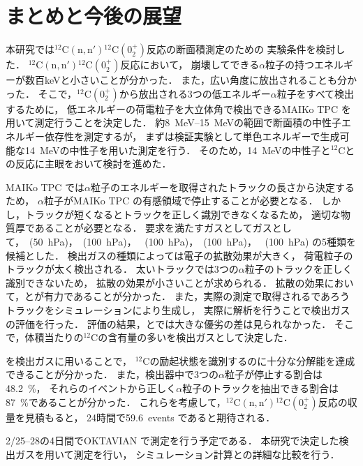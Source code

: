 \documentclass[../master]{subfiles}
\begin{document}
\chapter{まとめと今後の展望}
本研究では${}^{12}\mathrm{C}(\mathrm{n}, \mathrm{n}'){}^{12}\mathrm{C} (0_2^+)$反応の断面積測定のための
実験条件を検討した．
${}^{12}\mathrm{C}(\mathrm{n}, \mathrm{n}'){}^{12}\mathrm{C} (0_2^+)$反応において，
崩壊してできる$\alpha$粒子の持つエネルギーが数百\si{\kilo\electronvolt}と小さいことが分かった．
また，広い角度に放出されることも分かった．
そこで，${}^{12}\mathrm{C} (0_2^+)$から放出される3つの低エネルギー$\alpha$粒子をすべて検出するために，
低エネルギーの荷電粒子を大立体角で検出できるMAIKo TPC を用いて測定行うことを決定した．
約\SIrange{8}{15}{\mega\electronvolt}の範囲で断面積の中性子エネルギー依存性を測定するが，
まずは検証実験として単色エネルギーで生成可能な\SI{14}{\mega\electronvolt}の中性子を用いた測定を行う．
そのため，\SI{14}{\mega\electronvolt}の中性子と${}^{12}\mathrm{C}$との反応に主眼をおいて検討を進めた．

MAIKo TPC では$\alpha$粒子のエネルギーを取得されたトラックの長さから決定するため，
$\alpha$粒子がMAIKo TPC の有感領域で停止することが必要となる．
しかし，トラックが短くなるとトラックを正しく識別できなくなるため，
適切な物質厚であることが必要となる．
要求を満たすガスとしてガスとして，\Methane~(\SI{50}{\hecto\pascal})，\MethaneHydro~(\SI{100}{\hecto\pascal})，
\MethaneHerium~(\SI{100}{\hecto\pascal})，\isoButaneHydro~(\SI{100}{\hecto\pascal})，
\isoButaneHerium~(\SI{100}{\hecto\pascal}) の5種類を候補とした．
検出ガスの種類によっては電子の拡散効果が大きく，
荷電粒子のトラックが太く検出される．
太いトラックでは3つの$\alpha$粒子のトラックを正しく識別できないため，
拡散の効果が小さいことが求められる．
拡散の効果において，\MethaneHydro と\isoButaneHydro が有力であることが分かった．
また，実際の測定で取得されるであろうトラックをシミュレーションにより生成し，
実際に解析を行うことで検出ガスの評価を行った．
評価の結果，\MethaneHydro と\isoButaneHydro では大きな優劣の差は見られなかった．
そこで，体積当たりの${}^{12}\mathrm{C}$の含有量の多い\isoButaneHydro を検出ガスとして決定した．

\isoButaneHydro を検出ガスに用いることで，
${}^{12}\mathrm{C}$の励起状態を識別するのに十分な分解能を達成できることが分かった．
また，検出器中で3つの$\alpha$粒子が停止する割合は\SI{48.2}{\percent}，
それらのイベントから正しく$\alpha$粒子のトラックを抽出できる割合は\SI{87}{\percent}であることが分かった．
これらを考慮して，${}^{12}\mathrm{C}(\mathrm{n}, \mathrm{n}'){}^{12}\mathrm{C} (0_2^+)$反応の収量を見積もると，
24時間で59.6~events であると期待される．

2/25--28の4日間でOKTAVIAN で測定を行う予定である．
本研究で決定した検出ガスを用いて測定を行い，
シミュレーション計算との詳細な比較を行う．
\end{document}
